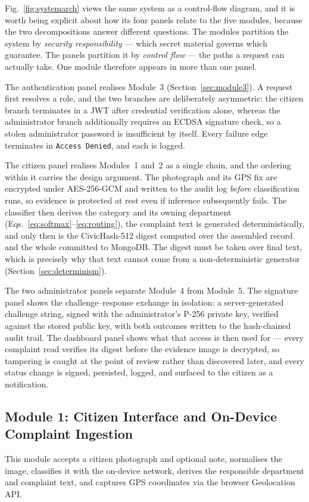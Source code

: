 \documentclass[conference]{IEEEtran}
\begin{document}
Fig.~\ref{fig:systemarch} views the same system as a control-flow diagram, and it is worth being explicit about how its four panels relate to the five modules, because the two decompositions answer different questions. The modules partition the system by \emph{security responsibility} --- which secret material governs which guarantee. The panels partition it by \emph{control flow} --- the paths a request can actually take. One module therefore appears in more than one panel.

The authentication panel realises Module~3 (Section~\ref{sec:module3}). A request first resolves a role, and the two branches are deliberately asymmetric: the citizen branch terminates in a JWT after credential verification alone, whereas the administrator branch additionally requires an ECDSA signature check, so a stolen administrator password is insufficient by itself. Every failure edge terminates in \texttt{Access Denied}, and each is logged.

The citizen panel realises Modules~1 and~2 as a single chain, and the ordering within it carries the design argument. The photograph and its GPS fix are encrypted under AES-256-GCM and written to the audit log \emph{before} classification runs, so evidence is protected at rest even if inference subsequently fails. The classifier then derives the category and its owning department (Eqs.~\ref{eq:softmax}--\ref{eq:routing}), the complaint text is generated deterministically, and only then is the CivicHash-512 digest computed over the assembled record and the whole committed to MongoDB. The digest must be taken over final text, which is precisely why that text cannot come from a non-deterministic generator (Section~\ref{sec:determinism}).

The two administrator panels separate Module~4 from Module~5. The signature panel shows the challenge--response exchange in isolation: a server-generated challenge string, signed with the administrator's P-256 private key, verified against the stored public key, with both outcomes written to the hash-chained audit trail. The dashboard panel shows what that access is then used for --- every complaint read verifies its digest before the evidence image is decrypted, so tampering is caught at the point of review rather than discovered later, and every status change is signed, persisted, logged, and surfaced to the citizen as a notification.

\subsection{Module 1: Citizen Interface and On-Device Complaint Ingestion}
This module accepts a citizen photograph and optional note, normalises the image, classifies it with the on-device network, derives the responsible department and complaint text, and captures GPS coordinates via the browser Geolocation API.
\end{document}
